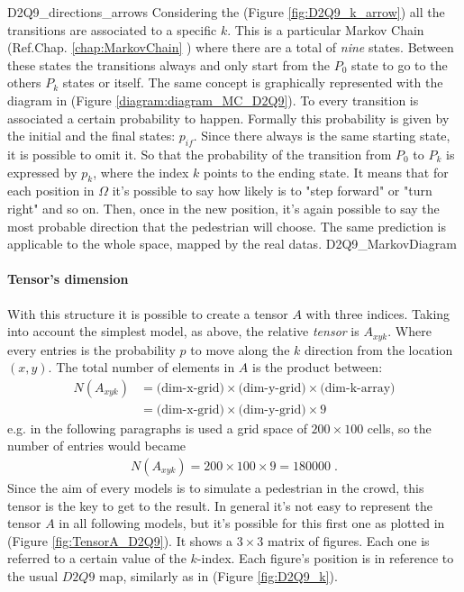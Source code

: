 \documentclass[class=article, crop=false]{standalone}
\begin{document}
	{D2Q9_directions_arrows}
Considering the (Figure \ref{fig:D2Q9_k_arrow}) all the transitions are associated to a specific $k$.
This is a particular Markov Chain (Ref.Chap. \ref{chap:MarkovChain} ) where there are a total of \emph{nine} states.
Between these states the transitions always and only start from the $P_0$ state to go to the others $P_k$ states or itself.
The same concept is graphically represented with the diagram in (Figure \ref{diagram:diagram_MC_D2Q9}).
To every transition is associated a certain probability to happen.
Formally this probability is given by the initial and the final states: $p_{if}$.
Since there always is the same starting state, it is possible to omit it.
So that the probability of the transition from $P_0$ to $P_k$ is expressed by $p_k$, where the index $k$ points to the ending state.
It means that for each position in $\Omega$ it's possible to say how likely is to "step forward" or "turn right" and so on.
Then, once in the new position, it's again possible to say the most probable direction that the pedestrian will choose.
The same prediction is applicable to the whole space, mapped by the real datas.
	{D2Q9_MarkovDiagram}
\paragraph{Tensor's dimension}
With this structure it is possible to create a tensor $A$ with three indices.
Taking into account the simplest model, as above, the relative \emph{tensor} is $A_{x y k}$.
Where every entries is the probability $p$ to move along the $k$ direction from the location $(x, y)$.
The total number of elements in $A$ is the product between: 
\begin{equation*}
\begin{split}
N(A_{xyk}) &= \mbox{(dim-x-grid)} \times \mbox{(dim-y-grid)} \times \mbox{(dim-k-array)} \\
& = \mbox{(dim-x-grid)} \times \mbox{(dim-y-grid)} \times 9
\end{split}
\end{equation*}
e.g. in the following paragraphs is used a grid space of $200\times100$ cells, so the number of entries would became 
\begin{equation*}
\begin{split}
N(A_{xyk})=200\times100\times9 = 180000 \; .
\end{split}
\end{equation*}
Since the aim of every models is to simulate a pedestrian in the crowd, this tensor is the key to get to the result.
In general it's not easy to represent the tensor $A$ in all following models, but it's possible for this first one as plotted in (Figure \ref{fig:TensorA_D2Q9}).
It shows a $3\times3$ matrix of figures.
Each one is referred to a certain value of the $k$-index.
Each figure's position is in reference to the usual $D2Q9$ map, similarly as in (Figure \ref{fig:D2Q9_k}).
\end{document}
